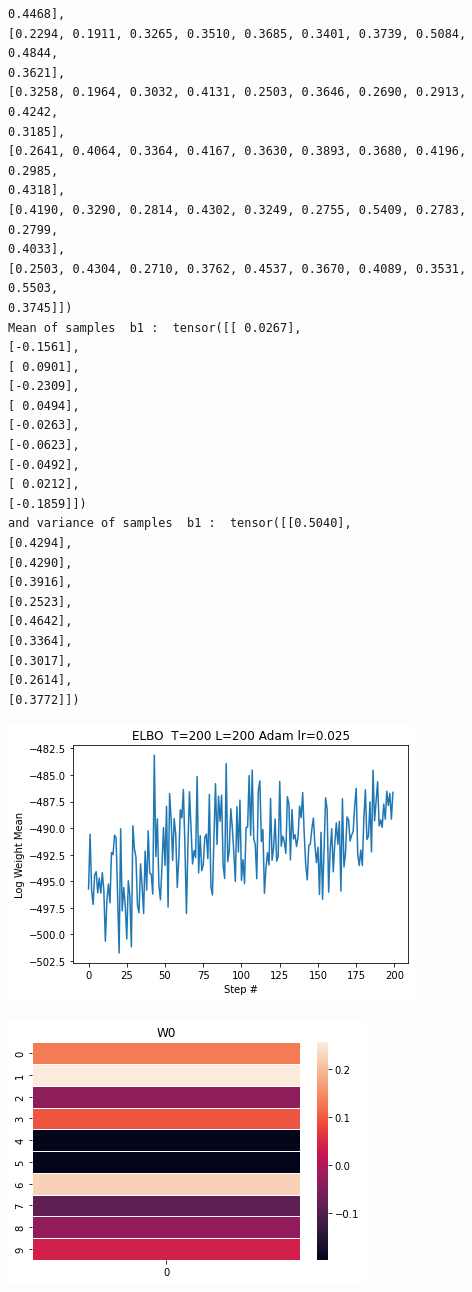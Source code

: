 \documentclass[]{article}
\begin{document}
\begin{verbatim}
0.4468],
[0.2294, 0.1911, 0.3265, 0.3510, 0.3685, 0.3401, 0.3739, 0.5084, 0.4844,
0.3621],
[0.3258, 0.1964, 0.3032, 0.4131, 0.2503, 0.3646, 0.2690, 0.2913, 0.4242,
0.3185],
[0.2641, 0.4064, 0.3364, 0.4167, 0.3630, 0.3893, 0.3680, 0.4196, 0.2985,
0.4318],
[0.4190, 0.3290, 0.2814, 0.4302, 0.3249, 0.2755, 0.5409, 0.2783, 0.2799,
0.4033],
[0.2503, 0.4304, 0.2710, 0.3762, 0.4537, 0.3670, 0.4089, 0.3531, 0.5503,
0.3745]])
Mean of samples  b1 :  tensor([[ 0.0267],
[-0.1561],
[ 0.0901],
[-0.2309],
[ 0.0494],
[-0.0263],
[-0.0623],
[-0.0492],
[ 0.0212],
[-0.1859]])
and variance of samples  b1 :  tensor([[0.5040],
[0.4294],
[0.4290],
[0.3916],
[0.2523],
[0.4642],
[0.3364],
[0.3017],
[0.2614],
[0.3772]])
\end{verbatim}
\begin{center}
	\includegraphics[width=\linewidth]{Figures/elbo_Adam4.png}
\end{center}
\begin{center}
	\includegraphics[width=\linewidth]{Figures/W0.png}
\end{center}
\end{document}
